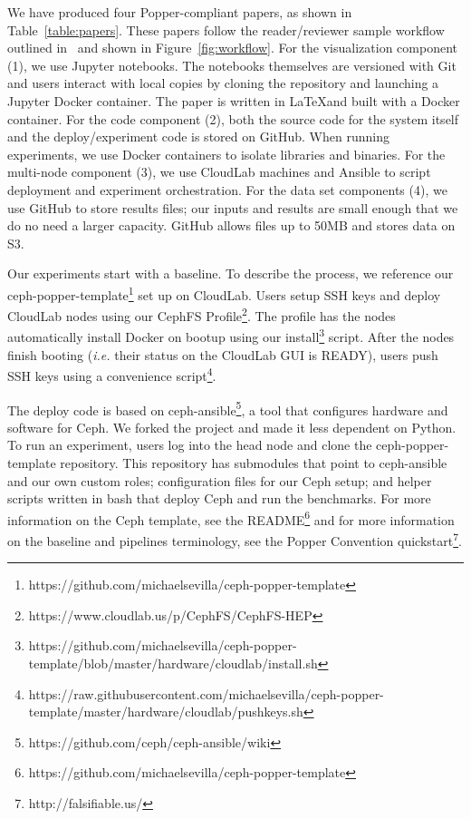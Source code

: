 We have produced four Popper-compliant papers, as shown in
Table~\ref{table:papers}. These papers follow the reader/reviewer sample
workflow outlined in~\cite{jimenez:ipdpsw17-popper} and shown in
Figure~\ref{fig:workflow}. For the visualization component (1), we use Jupyter
notebooks. The notebooks themselves are versioned with Git and users interact
with local copies by cloning the repository and launching a Jupyter Docker
container. The paper is written in \LaTeX and built with a Docker container.
For the code component (2), both the source code for the system itself and the
deploy/experiment code is stored on GitHub. When running experiments, we use
Docker containers to isolate libraries and binaries. For the multi-node
component (3), we use CloudLab machines and Ansible to script deployment and
experiment orchestration. For the data set components (4), we use GitHub to
store results files; our inputs and results are small enough that we do no need
a larger capacity.  GitHub allows files up to 50MB and stores data on S3.

Our experiments start with a baseline. To describe the process, we reference
our
ceph-popper-template\footnote{https://github.com/michaelsevilla/ceph-popper-template}
set up on CloudLab. Users setup SSH keys and deploy CloudLab nodes using our
CephFS Profile\footnote{https://www.cloudlab.us/p/CephFS/CephFS-HEP}.  The
profile has the nodes automatically install Docker on bootup using our
install\footnote{https://github.com/michaelsevilla/ceph-popper-template/blob/master/hardware/cloudlab/\-install.sh}
script. After the nodes finish booting ({\it i.e.}  their status on the
CloudLab GUI is READY), users push SSH keys using a convenience
script\footnote{https://raw.githubusercontent.com/michaelsevilla/ceph-popper-template/master/hardware/cloudlab/pushkeys.sh}.

The deploy code is based on
ceph-ansible\footnote{https://github.com/ceph/ceph-ansible/wiki}, a tool that
configures hardware and software for Ceph. We forked the project and made it
less dependent on Python. To run an experiment, users log into the head node
and clone the ceph-popper-template repository. This repository has submodules
that point to ceph-ansible and our own custom roles; configuration files for
our Ceph setup; and helper scripts written in bash that deploy Ceph and run the
benchmarks.  For more information on the Ceph template, see the
README\footnote{https://github.com/michaelsevilla/ceph-popper-template} and for
more information on the baseline and pipelines terminology, see the Popper
Convention quickstart\footnote{http://falsifiable.us/}. 


